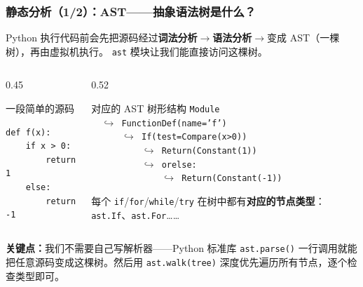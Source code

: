 \documentclass[presentation,aspectratio=169,fontset=none]{ctexbeamer}
\begin{document}
\begin{frame}[fragile]
\frametitle{静态分析（1/2）：AST——抽象语法树是什么？}
{\small Python 执行代码前会先把源码经过\textbf{词法分析}$\rightarrow$\textbf{语法分析}$\rightarrow$变成 AST（一棵树），再由虚拟机执行。%
\texttt{ast} 模块让我们能直接访问这棵树。}

\vspace{0.2cm}
\begin{columns}[T]
\begin{column}{0.45\textwidth}
\begin{block}{\small 一段简单的源码}
{\small
\begin{verbatim}
def f(x):
    if x > 0:
        return 1
    else:
        return -1
\end{verbatim}}
\end{block}
\end{column}
\begin{column}{0.52\textwidth}
\begin{block}{\small 对应的 AST 树形结构}
{\small
\texttt{Module} \\
\texttt{~~$\hookrightarrow$ FunctionDef(name='f')} \\
\texttt{~~~~~~$\hookrightarrow$ If(test=Compare(x>0))} \\
\texttt{~~~~~~~~~~$\hookrightarrow$ Return(Constant(1))} \\
\texttt{~~~~~~~~~~$\hookrightarrow$ orelse:} \\
\texttt{~~~~~~~~~~~~~~$\hookrightarrow$ Return(Constant(-1))}}

\vspace{0.15cm}
{\small 每个 \texttt{if}/\texttt{for}/\texttt{while}/\texttt{try} 在树中都有\textbf{对应的节点类型}：\texttt{ast.If}、\texttt{ast.For}……}
\end{block}
\end{column}
\end{columns}

\vspace{0.2cm}
{\small\textbf{关键点：}我们不需要自己写解析器——Python 标准库 \texttt{ast.parse()} 一行调用就能把任意源码变成这棵树。然后用 \texttt{ast.walk(tree)} 深度优先遍历所有节点，逐个检查类型即可。}
\end{frame}

\end{document}
